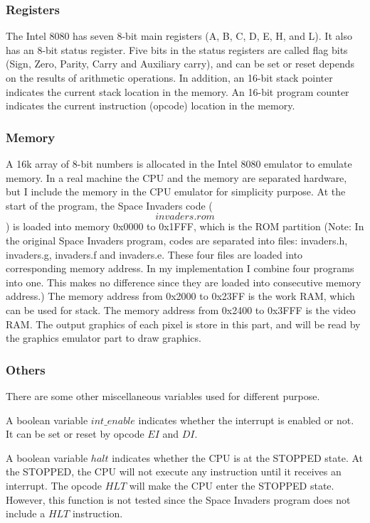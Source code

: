 \documentclass[a4paper,11pt]{article}
\theoremstyle{plain} %
\begin{document}
\subsubsection{Registers}
The Intel 8080 has seven 8-bit main registers (A, B, C, D, E, H, and L). It also has an 8-bit status register. Five bits in the status registers are called flag bits (Sign, Zero, Parity, Carry and Auxiliary carry), and can be set or reset depends on the results of arithmetic operations. In addition, an 16-bit stack pointer indicates the current stack location in the memory. An 16-bit program counter indicates the current instruction (opcode) location in the memory.

\subsubsection{Memory}
A 16k array of 8-bit numbers is allocated in the Intel 8080 emulator to emulate memory. In a real machine the CPU and the memory are separated hardware, but I include the memory in the CPU emulator for simplicity purpose. At the start of the program, the Space Invaders code ($$invaders.rom$$) is loaded into memory 0x0000 to 0x1FFF, which is the ROM partition (Note: In the original Space Invaders program, codes are separated into files: invaders.h, invaders.g, invaders.f and invaders.e. These four files are loaded into corresponding memory address. In my implementation I combine four programs into one. This makes no difference since they are loaded into consecutive memory address.)  The memory address from 0x2000 to 0x23FF is the work RAM, which can be used for stack. The memory address from 0x2400 to 0x3FFF is the video RAM. The output graphics of each pixel is store in this part, and will be read by the graphics emulator part to draw graphics. 

\subsubsection{Others}
There are some other miscellaneous variables used for different purpose. 

A boolean variable $int\_enable$ indicates whether the interrupt is enabled or not. It can be set or reset by opcode $EI$ and $DI$. 

A boolean variable $halt$ indicates whether the CPU is at the STOPPED state. At the STOPPED, the CPU will not execute any instruction until it receives an interrupt. The opcode $HLT$ will make the CPU enter the STOPPED state. However, this function is not tested since the Space Invaders program does not include a $HLT$ instruction. 
\end{document}
